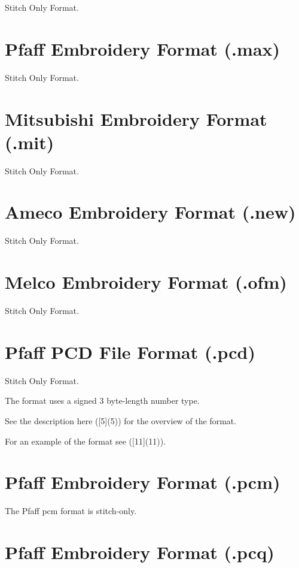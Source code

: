 \documentclass{report}
\begin{document}
Stitch Only Format.

\section{Pfaff Embroidery Format (.max)}

Stitch Only Format.

\section{Mitsubishi Embroidery Format (.mit)}

Stitch Only Format.

\section{Ameco Embroidery Format (.new)}

Stitch Only Format.

\section{Melco Embroidery Format (.ofm)}

Stitch Only Format.

\section{Pfaff PCD File Format (.pcd)}

Stitch Only Format.

The format uses a signed 3 byte-length number type.

See the description here ([5](5)) for the overview of the format.

For an example of the format see ([11](11)).

\section{Pfaff Embroidery Format (.pcm)}

The Pfaff pcm format is stitch-only.

\section{Pfaff Embroidery Format (.pcq)}
\end{document}

